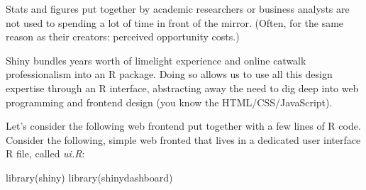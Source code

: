 \documentclass[
  12pt,
  letterpaper,
]{krantz}
\newenvironment{Shaded}{\begin{snugshade}}{\end{snugshade}}
\newcommand{\FunctionTok}[1]{\textcolor[rgb]{0.28,0.35,0.67}{#1}}
\newcommand{\NormalTok}[1]{\textcolor[rgb]{0.00,0.23,0.31}{#1}}
\begin{document}
Stats and figures put together by academic researchers or business
analysts are not used to spending a lot of time in front of the mirror.
(Often, for the same reason as their creators: perceived opportunity
costs.)

Shiny bundles years worth of limelight experience and
online catwalk professionalism into an R package. Doing so allows us to
use all this design expertise through an R interface, abstracting away
the need to dig deep into web programming and frontend design (you know
the HTML/CSS/JavaScript).

Let's consider the following web frontend put together with a few lines
of R code. Consider the following, simple web fronted that lives in a
dedicated user interface R file, called \emph{ui.R}:

\begin{Shaded}
\begin{Highlighting}[]
\FunctionTok{library}\NormalTok{(shiny)}
\FunctionTok{library}\NormalTok{(shinydashboard)}


\end{Highlighting}
\end{Shaded}
\end{document}
